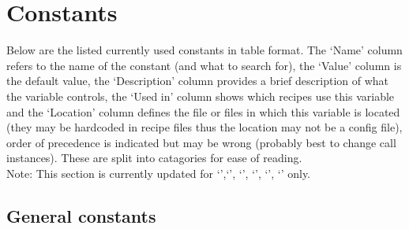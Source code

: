 \section{Constants}
\label{section:the_constants}





%
%


Below are the listed currently used constants in table format. The `Name' column refers to the name of the constant (and what to search for), the `Value' column is the default value, the `Description' column provides a brief description of what the variable controls, the `Used in' column shows which recipes use this variable and the `Location' column defines the file or files in which this variable is located (they may be hardcoded in recipe files thus the location may not be a config file), order of precedence is indicated but may be wrong (probably best to change call instances). These are split into catagories for ease of reading. \\

\noindent Note: This section is currently updated for `\caldark',`\calloc', `\calslit', `\calff', `\calext', `\calextall' only.

\vspace{0.5cm}
\subsection{General constants}

